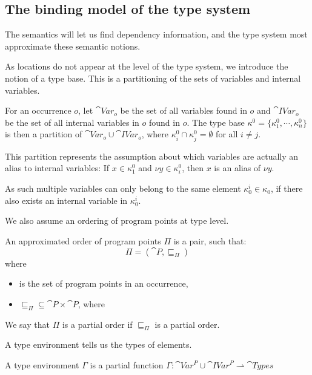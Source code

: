\documentclass[acmsmall,sigplan]{acmart}
\begin{document}
\subsection{The binding model of the type system}\label{sec:basis}

The semantics will let us find dependency information, and the type 
system most approximate these semantic notions.

As locations do not appear at the level of the type system, we
introduce the notion of a type base. This is a partitioning of the
sets of variables and internal variables. 

\begin{definition}
	For an occurrence $o$, let $\cat{Var}_o$ be the set of all
        variables found in $o$ and $\cat{IVar}_o$ be the set of all
        internal variables in $o$ found in $o$.
	The type base $\kappa^0=\{\kappa^0_1,\cdots,\kappa^0_n\}$ is
        then a partition of $\cat{Var}_o \cup \cat{IVar}_o$, where
        $\kappa_i^0\cap\kappa_j^0=\emptyset$ for all $i\neq j$. 
\end{definition}

This partition represents the assumption about which variables are
actually an alias to internal variables: If $x \in \kappa^0_1$ and
$\nu y \in \kappa^0_i$, then $x$ is an alias of $\nu y$.

As such multiple variables can only belong to the same element
$\kappa_0^i\in\kappa_0$, if there also exists an internal variable in
$\kappa_0^i$. 

We also assume an ordering of program points at type level.

\begin{definition}
	An approximated order of program points $\Pi$ is a pair, such that: 
	$$\Pi=(\cat{P},\sqsubseteq_\Pi)$$
	where
	\begin{itemize}
		\item {} is the set of program points in an occurrence,
		\item $\sqsubseteq_\Pi\subseteq\cat{P}\times\cat{P}$, where
	\end{itemize}
	We say that $\Pi$ is a partial order if $\sqsubseteq_\Pi$ is a partial order.
\end{definition}

A type environment tells us the types of elements.

\begin{definition}
	A type environment $\Gamma$ is a partial function $\Gamma:\cat{Var}^P\cup\cat{IVar}^P\rightharpoonup\cat{Types}$
\end{definition}
\end{document}
